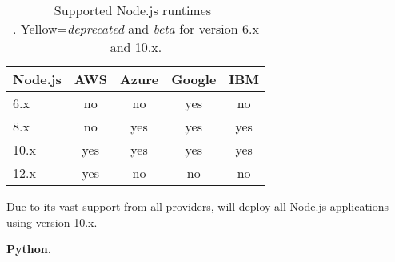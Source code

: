 \begin{table}[!t]
\centering
\captionsetup[table]{justification=centering, labelfont=bf}
\begin{tabular}{l|c|c|c|c} 
 Node.js & AWS & Azure & Google & IBM \\ \hline
6.x  & \cellcolor{red!25}no    & \cellcolor{red!25}no    & \cellcolor{yellow!25}yes  & \cellcolor{red!25}no\\ \hline
8.x  & \cellcolor{red!25}no & \cellcolor{green!25}yes & \cellcolor{green!25}yes   & \cellcolor{green!25}yes \\ \hline
10.x & \cellcolor{green!25}yes & \cellcolor{green!25}yes & \cellcolor{yellow!25}yes  & \cellcolor{green!25}yes \\ \hline
12.x & \cellcolor{green!25}yes & \cellcolor{red!25}no & \cellcolor{red!25}no & \cellcolor{red!25}no \\ \hline
\end{tabular}
\caption[Supported Node.js runtimes]{Supported Node.js runtimes~\cite{AWSLambdaLanguages, AzureFunctionsLanguages, GoogleFunctionsLanguages, IBMRuntimes}\\. Yellow=\textit{deprecated} and \textit{beta} for version 6.x and 10.x.}
\label{table:nodejs}
\end{table}

Due to its vast support from all providers, \sys will deploy all Node.js applications using version 10.x. 


\textbf{Python.}

